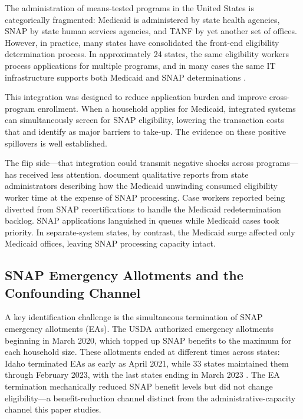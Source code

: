 \documentclass[12pt]{article}
\begin{document}
The administration of means-tested programs in the United States is categorically fragmented: Medicaid is administered by state health agencies, SNAP by state human services agencies, and TANF by yet another set of offices. However, in practice, many states have consolidated the front-end eligibility determination process. In approximately 24 states, the same eligibility workers process applications for multiple programs, and in many cases the same IT infrastructure supports both Medicaid and SNAP determinations \citep{clasp2023, chcs2024}.

This integration was designed to reduce application burden and improve cross-program enrollment. When a household applies for Medicaid, integrated systems can simultaneously screen for SNAP eligibility, lowering the transaction costs that \citet{currie2006} and \citet{finkelstein2019} identify as major barriers to take-up. The evidence on these positive spillovers is well established.

The flip side---that integration could transmit negative shocks across programs---has received less attention. \citet{chcs2024} document qualitative reports from state administrators describing how the Medicaid unwinding consumed eligibility worker time at the expense of SNAP processing. Case workers reported being diverted from SNAP recertifications to handle the Medicaid redetermination backlog. SNAP applications languished in queues while Medicaid cases took priority. In separate-system states, by contrast, the Medicaid surge affected only Medicaid offices, leaving SNAP processing capacity intact.

\subsection{SNAP Emergency Allotments and the Confounding Channel}

A key identification challenge is the simultaneous termination of SNAP emergency allotments (EAs). The USDA authorized emergency allotments beginning in March 2020, which topped up SNAP benefits to the maximum for each household size. These allotments ended at different times across states: Idaho terminated EAs as early as April 2021, while 33 states maintained them through February 2023, with the last states ending in March 2023 \citep{schanzenbach2023}. The EA termination mechanically reduced SNAP benefit levels but did not change eligibility---a benefit-reduction channel distinct from the administrative-capacity channel this paper studies.
\end{document}
